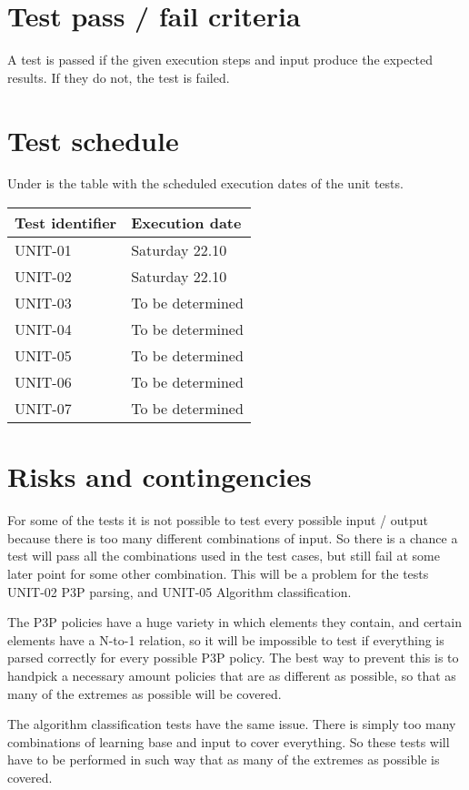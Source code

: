 \documentclass[12pt, fullpage, oneside]{report}
\begin{document}
	\section{Test pass / fail criteria}
		A test is passed if the given execution steps and input produce the expected results. If they do not, the test is failed.

	\section {Test schedule}
		Under is the table with the scheduled execution dates of the unit tests.

		\begin{center}
			\begin{tabular}{ |  p{5cm} | p{5cm} | }
				\hline
				Test identifier & Execution date \\ [5pt] \hline \hline
				UNIT-01 & Saturday 22.10 \\  [5pt] \hline
				UNIT-02 & Saturday 22.10 \\  [5pt] \hline
				UNIT-03 & To be determined \\  [5pt] \hline
				UNIT-04 & To be determined \\  [5pt] \hline
				UNIT-05 & To be determined \\  [5pt] \hline
				UNIT-06 & To be determined \\  [5pt] \hline
				UNIT-07 & To be determined \\  [5pt] \hline
			\end{tabular}
		\end{center}

	\section{Risks and contingencies}
		For some of the tests it is not possible to test every possible input / output because there is too many different combinations of input. So there is a chance a test will pass all the combinations used in the test cases, but still fail at some later point for some other combination. This will        		be a problem for the tests UNIT-02 P3P parsing, and UNIT-05 Algorithm classification.

		The P3P policies have a huge variety in which elements they contain, and certain elements have a N-to-1 relation, so it will be impossible to test if everything is parsed correctly for every possible P3P policy. The best way to prevent this is to handpick a necessary amount policies 
		that are as different as possible, so that as many of the extremes as possible will be covered.
	
		The algorithm classification tests have the same issue. There is simply too many combinations of learning base and input to cover everything. So these tests will have to be performed in such way that as many of the extremes as possible is covered.
\end{document}
